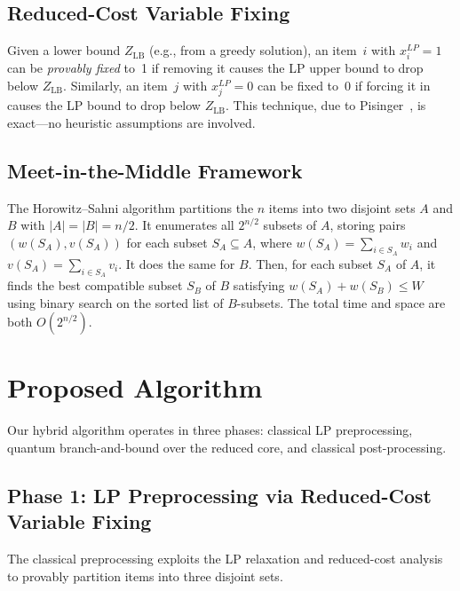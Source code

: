 \documentclass[conference]{IEEEtran} \IEEEoverridecommandlockouts
\begin{document}
\subsection{Reduced-Cost Variable Fixing}

Given a lower bound $Z_{\text{LB}}$ (e.g., from a greedy solution), an item~$i$ with $x_i^{LP} = 1$ can be \textit{provably fixed} to~1 if removing it causes the LP upper bound to drop below $Z_{\text{LB}}$. Similarly, an item~$j$ with $x_j^{LP} = 0$ can be fixed to~0 if forcing it in causes the LP bound to drop below $Z_{\text{LB}}$. This technique, due to Pisinger~\cite{ref4}, is exact---no heuristic assumptions are involved.

\subsection{Meet-in-the-Middle Framework}

The Horowitz--Sahni algorithm \cite{ref2} partitions the $n$ items into two disjoint sets $A$ and $B$ with $|A| = |B| = n/2$. It enumerates all $2^{n/2}$ subsets of $A$, storing pairs $(w(S_A), v(S_A))$ for each subset $S_A \subseteq A$, where $w(S_A) = \sum_{i \in S_A} w_i$ and $v(S_A) = \sum_{i \in S_A} v_i$. It does the same for $B$. Then, for each subset $S_A$ of $A$, it finds the best compatible subset $S_B$ of $B$ satisfying $w(S_A) + w(S_B) \leq W$ using binary search on the sorted list of $B$-subsets. The total time and space are both $O(2^{n/2})$.

\section{Proposed Algorithm}

Our hybrid algorithm operates in three phases: classical LP preprocessing, quantum branch-and-bound over the reduced core, and classical post-processing.

\subsection{Phase 1: LP Preprocessing via Reduced-Cost Variable Fixing}

The classical preprocessing exploits the LP relaxation and reduced-cost analysis to provably partition items into three disjoint sets.
\end{document}
